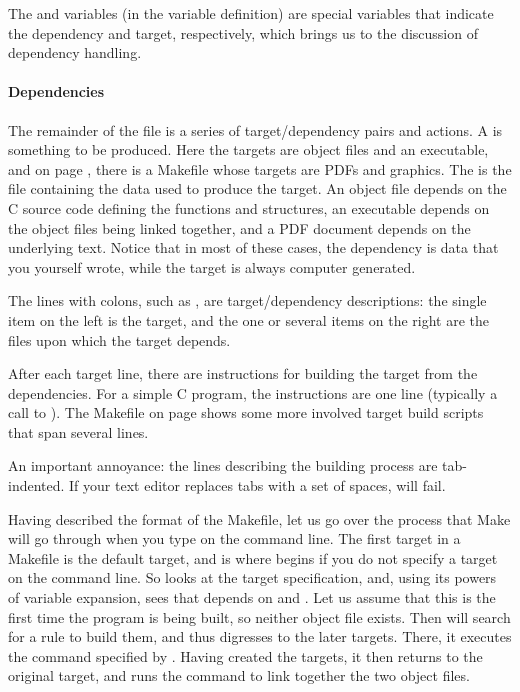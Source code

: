 The \ci{\$<} and  variables (in the  variable
definition) are special variables that indicate the dependency and target,
respectively, which brings us to the discussion of dependency handling.

\paragraph{Dependencies}
The remainder of the file is a series of target/dependency pairs and
actions. A  is something to be produced. Here the targets
are object
files and an executable, and on page \pageref{latexmake}, there is a Makefile
whose targets are PDFs and graphics. The  is the file
containing the data used to produce the target. An object file depends
on the C source code defining the functions and structures, an
executable depends on the object files being linked together, and a PDF
document depends on the underlying text. Notice that in most of these
cases, the dependency is data that you yourself wrote, while the target is
always computer generated. 

The lines with colons, such as , are
target/dependency descriptions: the single item on the left is the
target, and the one or several items on the right are the files upon
which the target depends.

After each target line, there are instructions for building the target
from the dependencies. For a simple C program, the instructions are one
line (typically a call to ). The Makefile on page
\pageref{latexmake} shows some more involved target build scripts that
span several lines. 

An important annoyance: the lines describing the building
process are tab-indented. If your text editor replaces tabs with a set
of spaces,  will fail.

Having described the format of the Makefile, let us go over the process
that Make will go through when you type  on the command line.
The first target in a Makefile is the default target, and is where
 begins if you do not specify a target on the command line. So
 looks at the target specification, and, using its powers of
variable expansion, sees that  depends on  and
. Let us assume that this is the first time the program is
being built, so neither object file exists. Then  will search
for a rule to build them, and thus digresses to the later targets.
There, it executes the command specified by .
Having created the targets, it then returns to the original target, and
runs the command to link together the two object files. 

